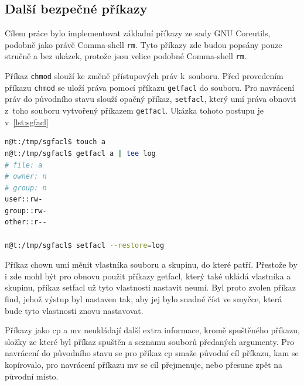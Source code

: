 \documentclass[thesis=M,czech]{FITthesis}[2012/06/26]
\begin{document}
\subsection{Další bezpečné příkazy}

Cílem práce bylo implementovat základní příkazy ze sady GNU Coreutils, podobně jako právě Comma-shell \texttt{rm}. Tyto příkazy zde budou popsány pouze stručně a bez ukázek, protože jsou velice podobné Comma-shell \texttt{rm}.

Příkaz \texttt{chmod} slouží ke změně přístupových práv k~souboru. Před provedením příkazu \texttt{chmod} se uloží práva pomocí příkazu \texttt{getfacl} do souboru. Pro navrácení práv do původního stavu slouží opačný příkaz, \texttt{setfacl}, který umí práva obnovit z~toho souboru vytvořený příkazem \texttt{getfacl}. Ukázka tohoto postupu je v~\ref{lst:sgfacl}

\noindent
\begin{minipage}{\linewidth}
\begin{lstlisting}[language=bash, caption={Kombinace příkazů \texttt{getfacl} a \texttt{setfacl}}, label={lst:sgfacl}]
n@t:/tmp/sgfacl$ touch a
n@t:/tmp/sgfacl$ getfacl a | tee log
# file: a
# owner: n
# group: n
user::rw-
group::rw-
other::r--

n@t:/tmp/sgfacl$ setfacl --restore=log
\end{lstlisting}
\end{minipage}

Příkaz chown umí měnit vlastníka souboru a skupinu, do které patří. Přestože by i zde mohl být pro obnovu použit příkazy getfacl, který také ukládá vlastníka a skupinu, příkaz setfacl už tyto vlastnosti nastavit neumí. Byl proto zvolen příkaz find, jehož výstup byl nastaven tak, aby jej bylo snadné číst ve smyčce, která bude tyto vlastnosti znovu nastavovat. 


Příkazy jako cp a mv neukládají další extra informace, kromě spuštěného příkazu, složky ze které byl příkaz spuštěn a seznamu souborů předaných argumenty. Pro navrácení do původního stavu se pro příkaz cp smaže původní cíl příkazu, kam se kopírovalo, pro navrácení příkazu mv se cíl přejmenuje, nebo přesune zpět na původní místo.



\end{document}
